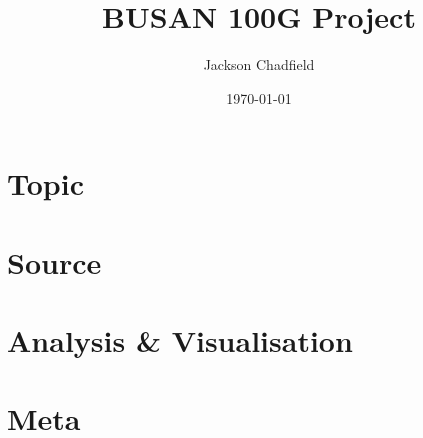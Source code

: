 \documentclass{article}
\title{BUSAN 100G Project}
\author{Jackson Chadfield}
\date{\today}
\begin{document}
\maketitle

\section{Topic}

\section{Source}

\section{Analysis \& Visualisation}

\section{Meta}
\end{document}
